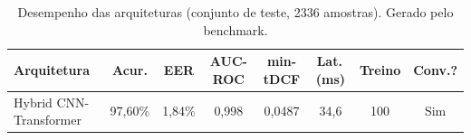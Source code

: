 \begin{table}[H]
\centering
\caption{Desempenho das arquiteturas (conjunto de teste, 2336 amostras). Gerado pelo benchmark.}
\label{tab:bench_resultados}
\small\singlespacing
\begin{tabular}{lccccccc}
\toprule
\textbf{Arquitetura} & \textbf{Acur.} & \textbf{EER} & \textbf{AUC-ROC} & \textbf{min-tDCF} & \textbf{Lat.\,(ms)} & \textbf{Treino} & \textbf{Conv.?} \\
\midrule
Hybrid CNN-Transformer & 97,60\% & 1,84\% & 0,998 & 0,0487 & 34,6 & 100 & \textcolor{successgreen}{Sim} \\
\bottomrule
\end{tabular}
\end{table}
